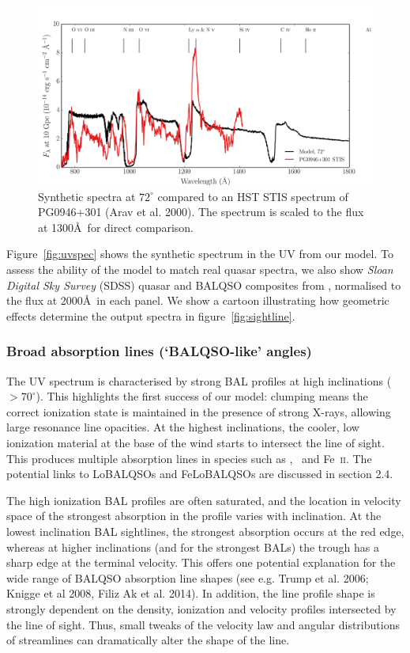 \documentclass[useAMS,usenatbib]{mn2e_x}
\begin{document}
\begin{figure} %
\centering
\includegraphics[width=1.0\textwidth]{figures/0946.png}
\caption
{
Synthetic spectra at $72^\circ$ compared to an HST STIS spectrum
of PG0946+301 (Arav et al. 2000). The spectrum is scaled to the flux at 1300\AA\
for direct comparison. 
}
\label{fig:stis}
\end{figure} %

Figure~\ref{fig:uvspec} shows the synthetic spectrum in the UV from our model. 
To assess the ability of the model to match real 
quasar spectra, we also show {\sl Sloan Digital Sky Survey} (SDSS) quasar and BALQSO 
composites from \cite{reichard2003}, normalised to the flux at 2000\AA\ in each panel. 
We show a cartoon illustrating how geometric effects determine
the output spectra in figure~\ref{fig:sightline}.  

\subsubsection{Broad absorption lines (`BALQSO-like' angles)}

The UV spectrum is characterised by strong BAL 
profiles at high inclinations ($> 70^\circ$). 
This highlights the first success of our model: 
clumping means the correct ionization state 
is maintained in the presence of strong X-rays, 
allowing large resonance line opacities. 
At the highest inclinations, the 
cooler, low ionization material at the base of the wind
starts to intersect the line of sight. This produces 
multiple absorption lines in species such as \mg,
\al\ and Fe~\textsc{ii}. The potential links to LoBALQSOs and 
FeLoBALQSOs are discussed in section 2.4.

The high ionization BAL profiles are often saturated, and the location in velocity space
of the strongest absorption in the profile varies with inclination.
At the lowest inclination BAL sightlines, the strongest absorption occurs at the red edge,
whereas at higher inclinations (and for the strongest BALs)
the trough has a sharp edge at the terminal velocity.
This offers one potential explanation for the wide range of BALQSO absorption
line shapes (see e.g. Trump et al. 2006; Knigge et al 2008, Filiz Ak et al. 2014).
In addition, the line profile shape is strongly dependent 
on the density, ionization and velocity 
profiles intersected by the line of sight. Thus, small tweaks of the velocity
law and angular distributions of streamlines can dramatically alter
the shape of the line.
\end{document}
